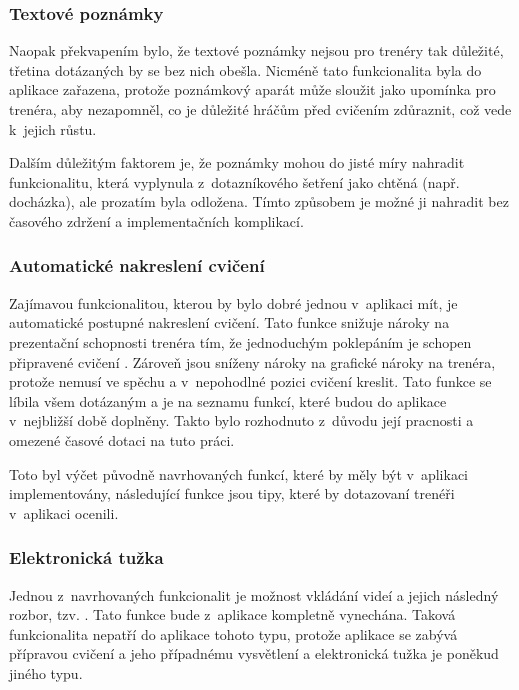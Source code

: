 \documentclass[thesis=B,czech]{FITthesis}[2012/06/26]
\begin{document}
\subsubsection{Textové poznámky}

	Naopak překvapením bylo, že textové poznámky nejsou pro trenéry tak důležité, třetina dotázaných by se bez nich obešla. Nicméně tato funkcionalita byla do aplikace zařazena, protože poznámkový aparát může sloužit jako upomínka pro trenéra, aby nezapomněl, co je důležité hráčům před cvičením zdůraznit, což vede k~jejich růstu.

	Dalším důležitým faktorem je, že poznámky mohou do jisté míry nahradit funkcionalitu, která vyplynula z~dotazníkového šetření jako chtěná (např. docházka), ale prozatím byla odložena. Tímto způsobem je možné ji nahradit bez časového zdržení a  implementačních komplikací.

\subsubsection{Automatické nakreslení cvičení}

	Zajímavou funkcionalitou, kterou by bylo dobré jednou v~aplikaci mít, je automatické postupné nakreslení cvičení. Tato funkce snižuje nároky na prezentační schopnosti trenéra tím, že jednoduchým poklepáním je schopen připravené cvičení . Zároveň jsou sníženy nároky na grafické nároky na trenéra, protože nemusí ve spěchu a v~nepohodlné pozici cvičení kreslit. Tato funkce se líbila všem dotázaným a je na seznamu funkcí, které budou do aplikace v~nejbližší době doplněny. Takto bylo rozhodnuto z~důvodu její pracnosti a omezené časové dotaci na tuto práci.

	Toto byl výčet původně navrhovaných funkcí, které by měly být v~aplikaci implementovány, následující funkce jsou tipy, které by dotazovaní trenéři v~aplikaci ocenili.

\subsubsection{Elektronická tužka}

	Jednou z~navrhovaných funkcionalit je možnost vkládání videí a jejich následný rozbor, tzv. . Tato funkce bude z~aplikace kompletně vynechána. Taková funkcionalita nepatří do aplikace tohoto typu, protože aplikace se zabývá přípravou cvičení a jeho případnému vysvětlení a elektronická tužka je poněkud jiného typu.
\end{document}
